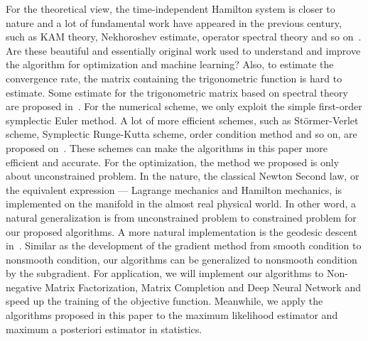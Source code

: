 \documentclass[11pt,fceqn]{article}
\numberwithin{equation}{section}
\theoremstyle{definition}
\begin{document}
For the theoretical view, the time-independent Hamilton system is  closer to nature and a lot of fundamental work have appeared in the previous century, such as KAM theory, Nekhoroshev estimate, operator spectral theory and so on~\citep{arnol2013mathematical,arnol?d2012geometrical}. Are these beautiful and essentially original work used to understand and improve the algorithm for optimization and machine learning? Also, to estimate the convergence rate,  the matrix containing the trigonometric function is hard to estimate. Some estimate for the trigonometric matrix based on spectral theory are proposed in~\citep{jitomirskaya2017arithmetic,liu2015anderson}. For the numerical scheme, we only exploit the simple first-order symplectic Euler method.  A lot of more efficient schemes, such as St\"{o}rmer-Verlet scheme, Symplectic Runge-Kutta scheme, order condition method and so on, are proposed on~\citep{hairer2006geometric}.  These schemes can make the algorithms in this paper more efficient and accurate.   For the optimization, the method we proposed is only about unconstrained problem. In the nature, the classical Newton Second law, or the equivalent expression --- Lagrange mechanics and Hamilton mechanics, is implemented on the manifold in the almost real physical world. In other word, a natural generalization is from unconstrained problem to constrained problem for our proposed algorithms. A more natural implementation is the geodesic descent in~\citep{luenberger1984linear}. Similar as the development of the gradient method from smooth condition to nonsmooth condition, our algorithms can be generalized to nonsmooth condition by the subgradient. For application, we will implement our algorithms to Non-negative Matrix Factorization, Matrix Completion and Deep Neural Network and speed up the training of the objective function. Meanwhile, we apply the algorithms proposed in this paper to the maximum likelihood estimator and maximum a posteriori estimator in statistics.
\end{document}

